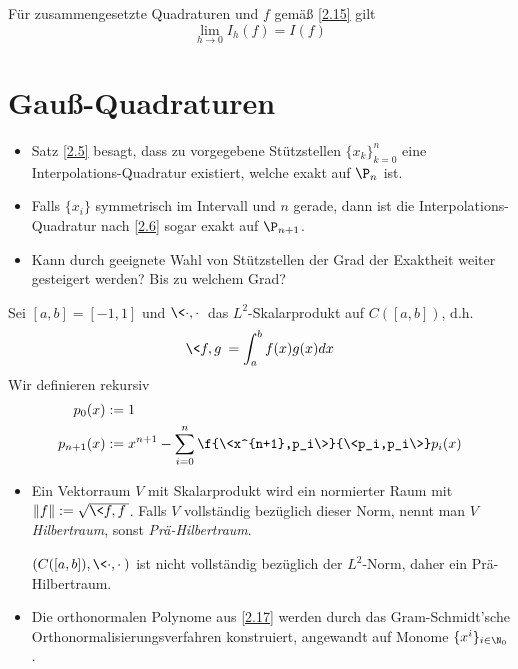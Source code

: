 \documentclass[11pt]{scrbook}
\begin{document}
\begin{kor}[Konvergenz]
	\label{2.16}
	Für zusammengesetzte Quadraturen und $f$ gemäß \ref{2.15} gilt
	\[
		\lim_{h \to 0} I_h(f) = I(f)
	\]
\end{kor}

\section{Gauß-Quadraturen}

\begin{itemize}
	\item
		Satz \ref{2.5} besagt, dass zu vorgegebene Stützstellen $\{x_k\}_{k=0}^n$ eine Interpolations-Quadratur existiert, welche exakt auf $\P_n$ ist.
	\item
		Falls $\{x_i\}$ symmetrisch im Intervall und $n$ gerade, dann ist die Interpolations-Quadratur nach \ref{2.6} sogar exakt auf $\P_{n+1}$.
	\item
		Kann durch geeignete Wahl von Stützstellen der Grad der Exaktheit weiter gesteigert werden? Bis zu welchem Grad?
\end{itemize}

\begin{df}
	\label{2.17}	
	Sei $[a,b] = [-1,1]$ und $\<\cdot, \cdot\>$ das $L^2$-Skalarprodukt auf $C([a,b])$, d.h.
	\[
		\<f,g\> = \int_a^b f(x)g(x) dx
	\]
	Wir definieren rekursiv
	\begin{align*}
		p_0(x) &:= 1 \\
		p_{n+1}(x) &:= x^{n+1}- \sum_{i=0}^n \f {\<x^{n+1},p_i\>}{\<p_i,p_i\>} p_i(x)
	\end{align*}
	\begin{note}
		\begin{itemize}
			\item
				Ein Vektorraum $V$ mit Skalarprodukt wird ein normierter Raum mit $\|f\| := \sqrt{\<f,f\>}$.
				Falls $V$ vollständig bezüglich dieser Norm, nennt man $V$ \emph{Hilbertraum}, sonst \emph{Prä-Hilbertraum}.

				$(C([a,b]),\<\cdot,\cdot\>)$ ist nicht vollständig bezüglich der $L^2$-Norm, daher ein Prä-Hilbertraum.
			\item
				Die orthonormalen Polynome aus \ref{2.17} werden durch das Gram-Schmidt'sche Orthonormalisierungsverfahren konstruiert, angewandt auf Monome $\{x^i\}_{i\in \N_0}$.

		\end{itemize}
	\end{note}
\end{df}
\end{document}
